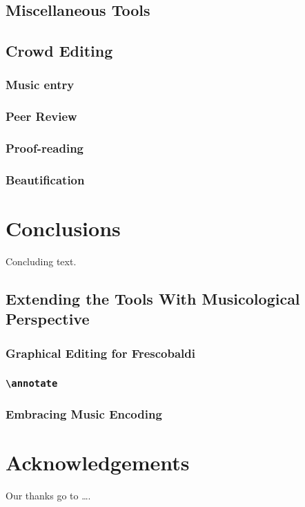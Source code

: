 \documentclass[11pt,a4paper]{article}
\begin{document}
\subsection{Miscellaneous Tools}


\subsection{Crowd Editing}

\subsubsection{Music entry}

\subsubsection{Peer Review}

\subsubsection{Proof-reading}

\subsubsection{Beautification}


\section{Conclusions}\label{sec:conclusions}

Concluding text.


\subsection{Extending the Tools With Musicological Perspective}

\subsubsection{Graphical Editing for Frescobaldi}

\subsubsection{\texttt{\textbackslash annotate}}

\subsubsection{Embracing Music Encoding}



\section{Acknowledgements}

Our thanks go to \ldots .
\end{document}
